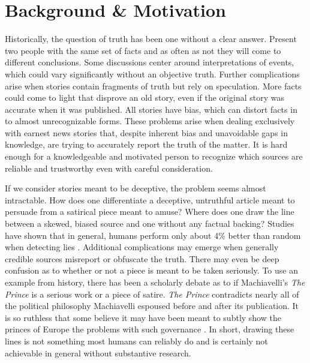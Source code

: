 \documentclass [12 pt] {report}
\begin{document}
\section{Background \& Motivation}\onehalfspacing
Historically, the question of truth has been one without a clear answer. Present two people with the same set of facts and as often as not they will come to different conclusions. Some discussions center around interpretations of events, which could vary significantly without an objective truth. Further complications arise when stories contain fragments of truth but rely on speculation. More facts could come to light that disprove an old story, even if the original story was accurate when it was published. All stories have bias, which can distort facts in to almost unrecognizable forms. These problems arise when dealing exclusively with earnest news stories that, despite inherent bias and unavoidable gaps in knowledge, are trying to accurately report the truth of the matter. It is hard enough for a knowledgeable and motivated person to recognize which sources are reliable and trustworthy even with careful consideration.

If we consider stories meant to be deceptive, the problem seems almost intractable. How does one differentiate a deceptive, untruthful article meant to persuade from a satirical piece meant to amuse? Where does one draw the line between a skewed, biased source and one without any factual backing? Studies have shown that in general, humans perform only about 4$\%$ better than random when detecting lies \cite{lie}. Additional complications may emerge when generally credible sources misreport or obfuscate the truth. There may even be deep confusion as to whether or not a piece is meant to be taken seriously. To use an example from history, there has been a scholarly debate as to if Machiavelli's \textit{The Prince} is a serious work or a piece of satire. \textit{The Prince} contradicts nearly all of the political philosophy Machiavelli espoused before and after its publication. It is so ruthless that some believe it may have been meant to subtly show the princes of Europe the problems with such governance \cite{Prince}. In short, drawing these lines is not something most humans can reliably do and is certainly not achievable in general without substantive research.
\end{document}
